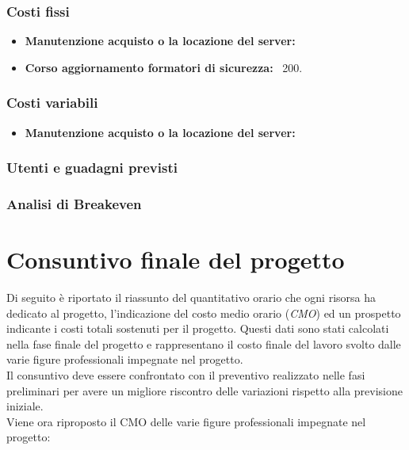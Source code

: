 \subsubsection{Costi fissi}

\begin{itemize}
	\item \textbf{Manutenzione acquisto o la locazione del server:} 
	\item \textbf{Corso aggiornamento formatori di sicurezza:} \EUR \ 200.
\end{itemize}

\subsubsection{Costi variabili}

\begin{itemize}
	\item \textbf{Manutenzione acquisto o la locazione del server:} 
\end{itemize}

\subsubsection{Utenti e guadagni previsti}


\subsubsection{Analisi di Breakeven}


\section{Consuntivo finale del progetto}

Di seguito è riportato il riassunto del quantitativo orario che ogni risorsa ha dedicato al progetto, l'indicazione del costo medio orario (\textit{CMO}) ed un prospetto indicante i costi totali sostenuti per il progetto.
Questi dati sono stati calcolati nella fase finale del progetto e rappresentano il costo finale del lavoro svolto dalle varie figure professionali impegnate nel progetto.\\
Il consuntivo deve essere confrontato con il preventivo realizzato nelle fasi preliminari per avere un migliore riscontro delle variazioni rispetto alla previsione iniziale.\\
Viene ora riproposto il CMO delle varie figure professionali impegnate nel progetto:	

